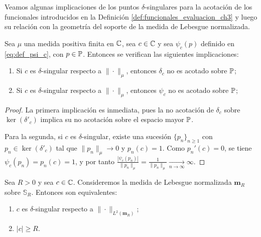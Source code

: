 Veamos algunas implicaciones de los puntos $\delta$-singulares para la acotación de los funcionales introducidos en la Definición \ref{def:funcionales_evaluacion_ch3} y luego su relación con la geometría del soporte de la medida de Lebesgue normalizada.

\begin{prop}\label{prop:caracterizacion_psi_c}
	Sea $\mu$ una medida positiva finita en $\mathbb{C}$, sea $c\in\mathbb{C}$ y sea $\psi_c(p)$ definido en \ref{eq:def_psi_c}, con $p\in\mathbb{P}$.
	Entonces se verifican las siguientes implicaciones:
	\begin{enumerate}
		\item Si $c$ es $\delta$-singular respecto a $\|\cdot\|_{\mu}$, entonces $\delta_c$ no es acotado sobre $\mathbb{P}$;
		\item Si $c$ es $\delta$-singular respecto a $\|\cdot\|_{\mu}$, entonces $\psi_c$ no es acotado sobre $\mathbb{P}$;
	\end{enumerate}
\end{prop}

\begin{proof}
	La primera implicación es inmediata, pues la no acotación de $\delta_c$ sobre $\ker(\delta'_c)$ implica su no acotación sobre el espacio mayor $\mathbb{P}$.

	Para la segunda, si $c$ es $\delta$-singular, existe una sucesión $\{p_n\}_{n\ge1}$ con $p_n \in \ker(\delta'_c)$ tal que $\|p_n\|_{\mu}\to0$ y $p_n(c)=1$.
	Como $p_n'(c)=0$, se tiene \(\psi_c(p_n)=p_n(c)=1\),
	y por tanto $\frac{|\psi_c(p_n)|}{\|p_n\|_{\mu}}=\frac1{\|p_n\|_{\mu}}\xrightarrow[n\to\infty]{}\infty$.
\end{proof}

\begin{thm}\label{thm:equivalencia_lebesgue}
	Sea $R>0$ y sea $c\in\mathbb{C}$. Consideremos la medida de Lebesgue normalizada $\mathbf{m}_R$ sobre $\mathbb{S}_R$. Entonces son equivalentes:
	\begin{enumerate}
		\item $c$ es $\delta$-singular respecto a $\|\cdot\|_{L^2(\mathbf{m}_R)}$;
		\item $|c|\ge R$.
	\end{enumerate}
\end{thm}

